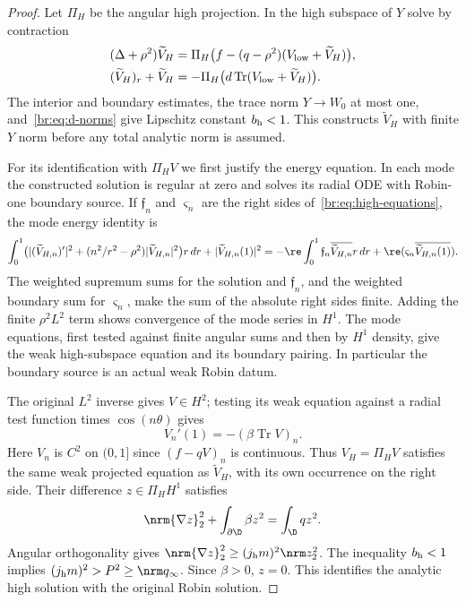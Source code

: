 \begin{proof}
Let $\Pi_H$ be the angular high projection. In the high subspace of $Y$
solve by contraction
\begin{equation}\label{br:eq:high-equations}
 \begin{split}
 (\Delta+\rho^2)\widetilde V_H
 &=\Pi_H\bigl(f-(q-\rho^2)(V_{\rm low}+\widetilde V_H)\bigr),\\
 (\widetilde V_H)_r+\widetilde V_H
 &=-\Pi_H\bigl(d\operatorname{Tr}(V_{\rm low}+\widetilde V_H)\bigr).
 \end{split}
\end{equation}
The interior and boundary estimates, the trace norm $Y\to W_0$ at most
one, and~\eqref{br:eq:d-norms} give Lipschitz constant $b_{\rm h}<1$.
This constructs $\widetilde V_H$ with finite $Y$ norm before any total
analytic norm is assumed.

For its identification with $\Pi_HV$ we first justify the energy
equation. In each mode the constructed solution is regular at zero and
solves its radial ODE with Robin-one boundary source. If $\mathfrak f_n$ and $\varsigma_n$
are the right sides of~\eqref{br:eq:high-equations}, the mode energy
identity is
\[
 \int_0^1\bigl(|(\widetilde V_{H,n})'|^2+
 (n^2/r^2-\rho^2)|\widetilde V_{H,n}|^2\bigr)r\,dr
 +|\widetilde V_{H,n}(1)|^2
 =-\re\int_0^1\mathfrak f_n\overline{\widetilde V_{H,n}}r\,dr
 +\re(\varsigma_n\overline{\widetilde V_{H,n}(1)}).
\]
The weighted supremum sums for the solution and $\mathfrak f_n$, and the weighted
boundary sum for $\varsigma_n$, make the sum of the absolute right sides finite.
Adding the finite $\rho^2L^2$ term shows convergence of the mode series
in $H^1$. The mode equations, first tested against finite angular sums
and then by $H^1$ density, give the weak high-subspace equation and its
boundary pairing. In particular the boundary source is an actual weak
Robin datum.

The original $L^2$ inverse gives $V\in H^2$; testing its weak equation
against a radial test function times $\cos(n\theta)$ gives
\begin{equation}\label{br:eq:mode-Robin}
 V_n'(1)=-(\beta\operatorname{Tr}V)_n.
\end{equation}
Here $V_n$ is $C^2$ on $(0,1]$ since $(f-qV)_n$ is continuous.
Thus $V_H=\Pi_HV$ satisfies the same weak projected equation as
$\widetilde V_H$, with its own occurrence on the right side. Their
difference $z\in\Pi_HH^1$ satisfies
\[
 \nrm{\nabla z}_2^2+\int_{\partial\D}\beta z^2=\int_\D qz^2.
\]
Angular orthogonality gives
$\nrm{\nabla z}_2^2\ge(j_{\rm h}m)^2\nrm z_2^2$.
The inequality $b_{\rm h}<1$ implies $(j_{\rm h}m)^2>P^2\ge\nrm q_\infty$.
Since $\beta>0$, $z=0$. This identifies the analytic high solution
with the original Robin solution.


\end{proof}
